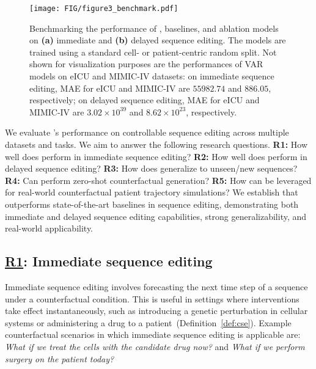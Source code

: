 

\begin{figure*}[ht]
\begin{center}
\centerline{\texttt{[image: FIG/figure3\_benchmark.pdf]}}
\caption{Benchmarking the performance of \name, baselines, and ablation models on \textbf{(a)} immediate and \textbf{(b)} delayed sequence editing. The models are trained using a standard cell- or patient-centric random split. Not shown for visualization purposes are the performances of VAR models on eICU and MIMIC-IV datasets: on immediate sequence editing, MAE for eICU and MIMIC-IV are $55982.74$ and $886.05$, respectively; on delayed sequence editing, MAE for eICU and MIMIC-IV are $3.02 \times 10^{39}$ and $8.62 \times 10^{23}$, respectively.}
\label{fig:benchmark}
\end{center}
\vskip -0.35in
\end{figure*}




We evaluate \name's performance on controllable sequence editing across multiple datasets and tasks. We aim to answer the following research questions. 
\textbf{R1:} How well does \name perform in immediate sequence editing?
\textbf{R2:} How well does \name perform in delayed sequence editing?
\textbf{R3:} How does \name generalize to unseen/new sequences?
\textbf{R4:} Can \name perform zero-shot counterfactual generation?
\textbf{R5:} How can \name be leveraged for real-world counterfactual patient trajectory simulations?
We establish that \name outperforms state-of-the-art baselines in sequence editing, demonstrating both immediate and delayed sequence editing capabilities, strong generalizability, and real-world applicability.


\subsection{\underline{R1}: Immediate sequence editing}\label{results:r1}

Immediate sequence editing involves forecasting the next time step of a sequence under a counterfactual condition. This is useful in settings where interventions take effect instantaneously, such as introducing a genetic perturbation in cellular systems or administering a drug to a patient~(Definition~\ref{def:cse}). Example counterfactual scenarios in which immediate sequence editing is applicable are: \textit{What if we treat the cells with the candidate drug now?} and \textit{What if we perform surgery on the patient today?}




